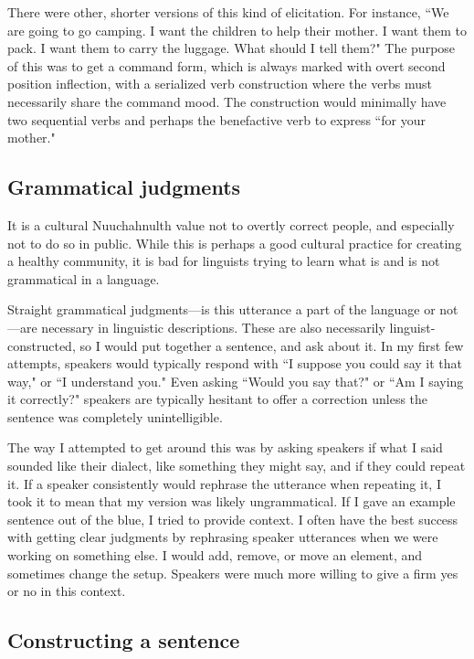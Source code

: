There were other, shorter versions of this kind of elicitation. For instance, ``We are going to go camping. I want the children to help their mother. I want them to pack. I want them to carry the luggage. What should I tell them?" The purpose of this was to get a command form, which is always marked with overt second position inflection, with a serialized verb construction where the verbs must necessarily share the command mood. The construction would minimally have two sequential verbs and perhaps the benefactive verb to express ``for your mother."

\subsection{Grammatical judgments}

It is a cultural Nuuchahnulth value not to overtly correct people, and especially not to do so in public. While this is perhaps a good cultural practice for creating a healthy community, it is bad for linguists trying to learn what is and is not grammatical in a language.

Straight grammatical judgments---is this utterance a part of the language or not---are necessary in linguistic descriptions. These are also necessarily linguist-constructed, so I would put together a sentence, and ask about it. In my first few attempts, speakers would typically respond with ``I suppose you could say it that way," or ``I understand you." Even asking ``Would you say that?" or ``Am I saying it correctly?" speakers are typically hesitant to offer a correction unless the sentence was completely unintelligible.

The way I attempted to get around this was by asking speakers if what I said sounded like their dialect, like something they might say, and if they could repeat it. If a speaker consistently would rephrase the utterance when repeating it, I took it to mean that my version was likely ungrammatical. If I gave an example sentence out of the blue, I tried to provide context. I often have the best success with getting clear judgments by rephrasing speaker utterances when we were working on something else. I would add, remove, or move an element, and sometimes change the setup. Speakers were much more willing to give a firm yes or no in this context.

\subsection{Constructing a sentence}

